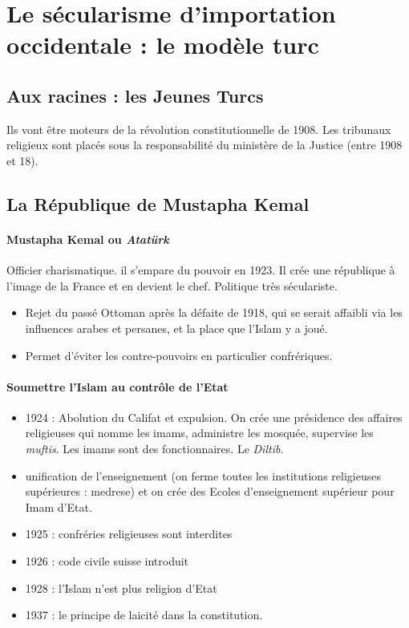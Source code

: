   \section{Le sécularisme d'importation
  occidentale : le modèle
  turc}

  

  
    
    \subsection{Aux racines : les Jeunes Turcs}
Ils vont être moteurs de la révolution constitutionnelle de 1908. 
Les tribunaux religieux sont placés sous la responsabilité du ministère de la Justice (entre 1908 et 18). 
    
      \subsection{La République de Mustapha Kemal}
\paragraph{Mustapha Kemal ou \textit{Atatürk}} Officier charismatique. il s'empare du pouvoir en 1923. Il crée une république à l'image de la France et en devient le chef. Politique très séculariste. 
\begin{itemize}
    \item Rejet du passé Ottoman après la défaite de 1918, qui se serait affaibli via les influences arabes et persanes, et la place que l'Islam y a joué.
    \item  Permet d'éviter les contre-pouvoirs en particulier confrériques. 
\end{itemize}

\paragraph{Soumettre l'Islam au contrôle de l'Etat}
\begin{itemize}
    \item 1924 : Abolution du Califat et expulsion. On crée une présidence des affaires religieuses qui nomme les imams, administre les mosquée, supervise les \textit{muftis}. Les imams sont des fonctionnaires. Le \textit{Diltib}.
    \item unification de l'enseignement (on ferme toutes les institutions religieuses supérieures : medrese) et on crée des Ecoles d'enseignement supérieur pour Imam d'Etat.
    \item 1925 : confréries religieuses sont interdites
    \item 1926 : code civile suisse introduit
    \item 1928 : l'Islam n'est plus religion d'Etat
    \item 1937 : le principe de laicité dans la constitution.
\end{itemize}

